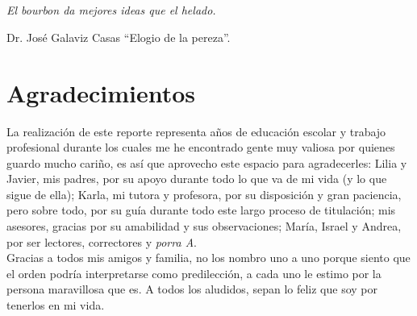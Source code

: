 \chapter*{}\label{epigrafe}
\thispagestyle{empty}
\begin{flushright}
	\begin{Large}
		\textit{El bourbon da mejores ideas que el helado.}\\
	\end{Large}
Dr. José Galaviz Casas ``Elogio de la pereza''.
\end{flushright}
\clearpage

\chapter*{Agradecimientos}\label{agradecimientos}
\thispagestyle{empty}
\noindent La realización de este reporte representa años de educación escolar y trabajo profesional durante los cuales me he encontrado gente muy valiosa por quienes guardo mucho cariño, es así que aprovecho este espacio para agradecerles: Lilia y Javier, mis padres, por su apoyo durante todo lo que va de mi vida (y lo que sigue de ella); Karla, mi tutora y profesora, por su disposición y gran paciencia, pero sobre todo, por su guía durante todo este largo proceso de titulación; mis asesores, gracias por su amabilidad y sus observaciones; María, Israel y Andrea, por ser lectores, correctores y \textit{porra A}.\\
\indent Gracias a todos mis amigos y familia, no los nombro uno a uno porque siento que el orden podría interpretarse como predilección, a cada uno le estimo por la persona maravillosa que es. A todos los aludidos, sepan lo feliz que soy por tenerlos en mi vida.
\clearpage
